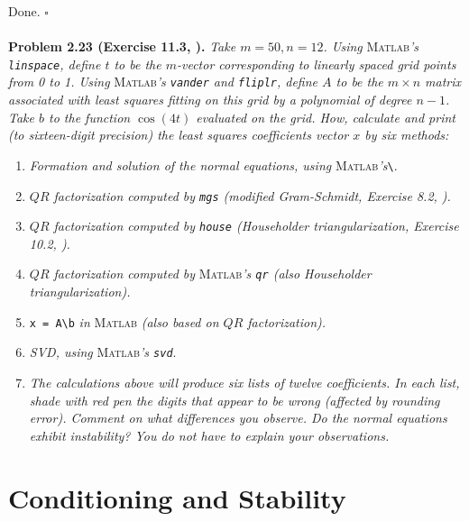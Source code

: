 \documentclass[a4paper,oneside]{book}
\numberwithin{equation}{chapter}
\begin{document}
Done. \hfill $\square$\\
\\
\textbf{Problem 2.23 (Exercise 11.3, \cite{1}).} \textit{Take $m=50,n=12$. Using}\textsc{ Matlab}\textit{'s \texttt{linspace}, define $t$ to be the $m$-vector corresponding to linearly spaced grid points from 0 to 1. Using}\textsc{ Matlab}\textit{'s \texttt{vander} and \texttt{fliplr}, define $A$ to be the $m\times n$ matrix associated with least squares fitting on this grid by a polynomial of degree $n-1$. Take $b$ to the function $\cos \left(4t\right)$ evaluated on the grid. How, calculate and print (to sixteen-digit precision) the least squares coefficients vector $x$ by six methods:}
\begin{enumerate}
\item \textit{Formation and solution of the normal equations, using}\textsc{ Matlab}\textit{'s}\verb|\|.
\item \textit{$QR$ factorization computed by \texttt{mgs} (modified Gram-Schmidt, Exercise 8.2, \cite{1}).}
\item \textit{$QR$ factorization computed by \texttt{house} (Householder triangularization, Exercise 10.2, \cite{2}).}
\item \textit{$QR$ factorization computed by}\textsc{ Matlab}\textit{'s \texttt{qr} (also Householder triangularization).}
\item \verb|x = A\b|\textit{ in}\textsc{ Matlab}\textit{ (also based on $QR$ factorization).}
\item \textit{SVD, using}\textsc{ Matlab}\textit{'s \texttt{svd}}.
\item \textit{The calculations above will produce six lists of twelve coefficients. In each list, shade with red pen the digits that appear to be wrong (affected by rounding error). Comment on what differences you observe. Do the normal equations exhibit instability? You do not have to explain your observations.}
\end{enumerate}





\chapter{Conditioning and Stability}
\end{document}
